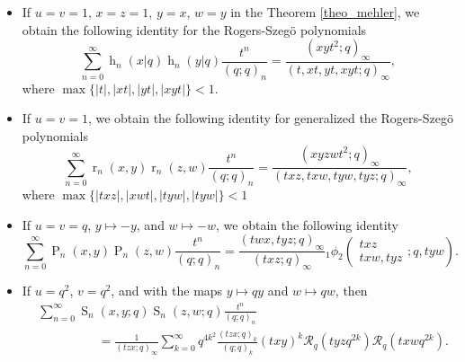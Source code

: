 \documentclass{cimart}
\DeclareMathOperator{\oph}{h}
\DeclareMathOperator{\opP}{P}
\DeclareMathOperator{\opr}{r}
\DeclareMathOperator{\opS}{S}
\begin{document}
\begin{itemize}
    \item 
    If $u=v=1$, $x=z=1$, $y=x$, $w=y$ in the Theorem \ref{theo_mehler}, we obtain the following identity for the Rogers-Szeg\"o polynomials 
\begin{equation*}
    \sum_{n=0}^{\infty}\oph_{n}(x|q)\oph_{n}(y|q)\frac{t^n}{(q;q)_{n}}=\frac{(xyt^2;q)_{\infty}}{(t,x t,yt,x yt;q)_{\infty}},
\end{equation*}
where $\max\{\vert t\vert,\vert xt\vert,\vert yt\vert, \vert xyt\vert\}<1$.
    \item 
    If $u=v=1$, we obtain the following identity \cite{saad} for generalized the Rogers-Szeg\"o polynomials 
\begin{equation*}
    \sum_{n=0}^{\infty}\opr_{n}(x,y)\opr_{n}(z,w)\frac{t^n}{(q;q)_{n}}=\frac{(xyzwt^2;q)_{\infty}}{(txz,txw,tyw,tyz;q)_{\infty}},
\end{equation*}
where $\max\{\vert txz\vert,\vert xwt\vert,\vert tyw\vert, \vert tyw\vert\}<1$
    \item 
    If $u=v=q$, $y\mapsto-y$, and $w\mapsto-w$, we obtain the following identity 
\begin{equation}\label{eqn_mehlerPP}
    \sum_{n=0}^{\infty}\opP_{n}(x,y)\opP_{n}(z,w)\frac{t^n}{(q;q)_{n}}=\frac{(twx,tyz;q)_{\infty}}{(txz;q)_{\infty}}{}_{1}\phi_{2}\left(
        \begin{array}{c}
            txz\\
             txw,tyz
        \end{array};
        q,tyw
        \right).
\end{equation}
    
    \item 
    If $u=q^2$, $v=q^2$, and with the maps $y\mapsto qy$ and $w\mapsto qw$, then
\begin{align}
    &\sum_{n=0}^{\infty}\opS_{n}(x,y;q)\opS_{n}(z,w;q)\frac{t^n}{(q;q)_{n}}\nonumber\\
    &\hspace{2cm}=\frac{1}{(tzx;q)_{\infty}}\sum_{k=0}^{\infty}q^{4k^2}\frac{(tzx;q)_{k}}{(q;q)_{k}}(txy)^k\mathcal{R}_{q}(tyzq^{2k})\mathcal{R}_{q}(txwq^{2k}).
\end{align}


\end{itemize}
\end{document}
